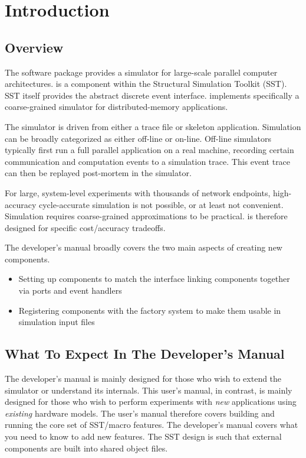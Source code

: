 
\chapter{Introduction}\label{chapter:intro}

\section{Overview}
\label{sec:intro:overview}

The \sstmacro software package provides a simulator for large-scale parallel computer architectures.
\sstmacro is a component within the Structural Simulation Toolkit (SST).
SST itself provides the abstract discrete event interface.
\sstmacro implements specifically a coarse-grained simulator for distributed-memory applications. 

The simulator is driven from either a trace file or skeleton application. 
Simulation can be broadly categorized as either off-line or on-line.
Off-line simulators typically first run a full parallel application on a real machine,
recording certain communication and computation events to a simulation trace.
This event trace can then be replayed post-mortem in the simulator.

For large, system-level experiments with thousands of network endpoints, high-accuracy cycle-accurate simulation is not possible,
or at least not convenient.
Simulation requires coarse-grained approximations to be practical.
\sstmacro is therefore designed for specific cost/accuracy tradeoffs.

The developer's manual broadly covers the two main aspects of creating new components.
\begin{itemize}
\item Setting up components to match the  interface linking components together via ports and event handlers
\item Registering components with the factory system to make them usable in simulation input files
\end{itemize}

\section{What To Expect In The Developer's Manual}
The developer's manual is mainly designed for those who wish to extend the simulator or understand its internals.
This user's manual, in contrast, is mainly designed for those who wish to perform experiments with \emph{new} applications using \emph{existing} hardware models.
The user's manual therefore covers building and running the core set of SST/macro features.
The developer's manual covers what you need to know to add new features.
The SST design is such that external components are built into shared object  files.

